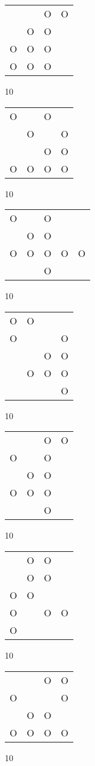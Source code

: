 \begin{tabular}{|m{0.2cm}m{0.2cm}m{0.2cm}m{0.2cm}|}\hline
 & &O&O\\
 &O&O& \\
O&O&O& \\
O&O&O& \\
\hline\end{tabular}10
\begin{tabular}{|m{0.2cm}m{0.2cm}m{0.2cm}m{0.2cm}|}\hline
O& &O& \\
 &O& &O\\
 & &O&O\\
O&O&O&O\\
\hline\end{tabular}10
\begin{tabular}{|m{0.2cm}m{0.2cm}m{0.2cm}m{0.2cm}m{0.2cm}|}\hline
O& &O& & \\
 &O&O& & \\
O&O&O&O&O\\
 & &O& & \\
\hline\end{tabular}10
\begin{tabular}{|m{0.2cm}m{0.2cm}m{0.2cm}m{0.2cm}|}\hline
O&O& & \\
O& & &O\\
 & &O&O\\
 &O&O&O\\
 & & &O\\
\hline\end{tabular}10
\begin{tabular}{|m{0.2cm}m{0.2cm}m{0.2cm}m{0.2cm}|}\hline
 & &O&O\\
O& &O& \\
 &O&O& \\
O&O&O& \\
 & &O& \\
\hline\end{tabular}10
\begin{tabular}{|m{0.2cm}m{0.2cm}m{0.2cm}m{0.2cm}|}\hline
 &O&O& \\
 &O&O& \\
O&O& & \\
O& &O&O\\
O& & & \\
\hline\end{tabular}10
\begin{tabular}{|m{0.2cm}m{0.2cm}m{0.2cm}m{0.2cm}|}\hline
 & &O&O\\
O& & &O\\
 &O&O& \\
O&O&O&O\\
\hline\end{tabular}10
